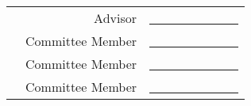 \thispagestyle{empty}
\begin{center}
    \spacedlowsmallcaps{\myName} \\ \medskip                        

    \begingroup
        \color{Maroon}\spacedallcaps{\myTitle}
    \endgroup
\end{center}        

\begin{tabular}{Xrl}
 & Advisor          & \underline{~~~~~~~~~~~~~~} \\
 & Committee Member & \underline{~~~~~~~~~~~~~~} \\
 & Committee Member & \underline{~~~~~~~~~~~~~~} \\
 & Committee Member & \underline{~~~~~~~~~~~~~~} \\
\end{tabular}
